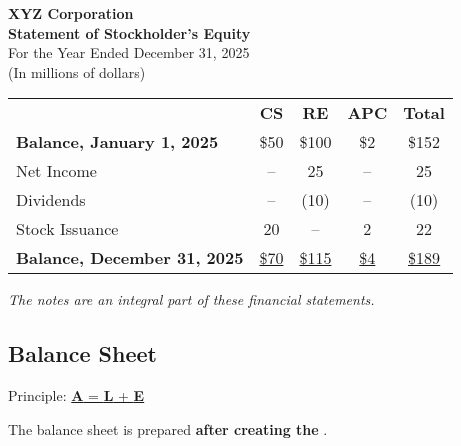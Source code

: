 \begin{tcolorbox}[colframe=black,colback=white,title=Example Statement of Stockholder's Equity]
    \begin{center}
        \textbf{XYZ Corporation}\\
        \textbf{Statement of Stockholder's Equity}\\
        For the Year Ended December 31, 2025\\
        (In millions of dollars)
    \end{center}

    \begin{tabular}{lcccc}
                                            & \textbf{CS}      & \textbf{RE}       & \textbf{APC}    & \textbf{Total}                \\
        \textbf{Balance, January 1, 2025}   & \$50             & \$100             & \$2             & \$152                         \\
        Net Income                          & --               & 25                & --              & 25                            \\
        Dividends                           & --               & (10)              & --              & (10)                          \\
        Stock Issuance                      & 20               & --                & 2               & 22                            \\
        \textbf{Balance, December 31, 2025} & \underline{\$70} & \underline{\$115} & \underline{\$4} & \underline{\underline{\$189}} \\
    \end{tabular}

    \vspace{1em}

    \textit{\footnotesize{The notes are an integral part of these financial statements.}}
\end{tcolorbox}

\normalsize

\subsection{Balance Sheet}
\label{sec:balance_sheet}

Principle: \hyperref[thm:relations]{\textbf{A} = \textbf{L} + \textbf{E}}

The balance sheet is prepared \textbf{after creating the }.

